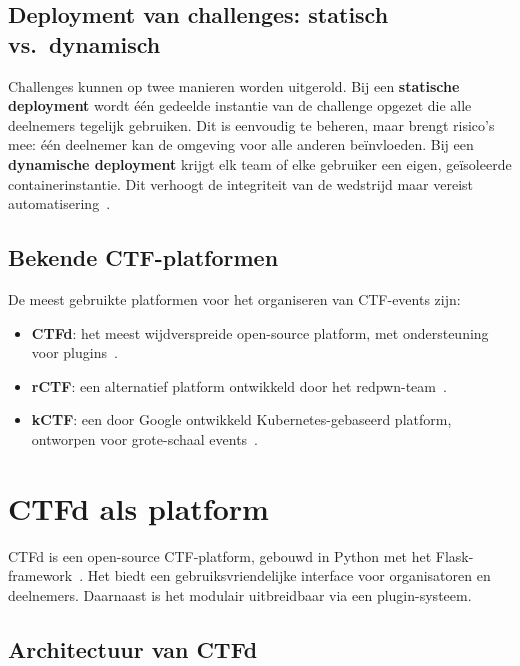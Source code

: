 \subsection{Deployment van challenges: statisch vs.\ dynamisch}

Challenges kunnen op twee manieren worden uitgerold. Bij een \textbf{statische deployment} wordt één gedeelde instantie van de challenge opgezet die alle deelnemers tegelijk gebruiken. Dit is eenvoudig te beheren, maar brengt risico's mee: één deelnemer kan de omgeving voor alle anderen beïnvloeden. Bij een \textbf{dynamische deployment} krijgt elk team of elke gebruiker een eigen, geïsoleerde containerinstantie. Dit verhoogt de integriteit van de wedstrijd maar vereist automatisering~\autocite{CTFd}.

\subsection{Bekende CTF-platformen}

De meest gebruikte platformen voor het organiseren van CTF-events zijn:

\begin{itemize}
  \item \textbf{CTFd}: het meest wijdverspreide open-source platform, met ondersteuning voor plugins~\autocite{CTFdGitHub}.
  \item \textbf{rCTF}: een alternatief platform ontwikkeld door het redpwn-team~\autocite{rCTF}.
  \item \textbf{kCTF}: een door Google ontwikkeld Kubernetes-gebaseerd platform, ontworpen voor grote-schaal events~\autocite{kCTF}.
\end{itemize}

\section{CTFd als platform}%
\label{sec:ctfd}

CTFd is een open-source CTF-platform, gebouwd in Python met het Flask-framework~\autocite{CTFdGitHub,CTFdOverview}. Het biedt een gebruiksvriendelijke interface voor organisatoren en deelnemers. Daarnaast is het modulair uitbreidbaar via een plugin-systeem.

\subsection{Architectuur van CTFd}

